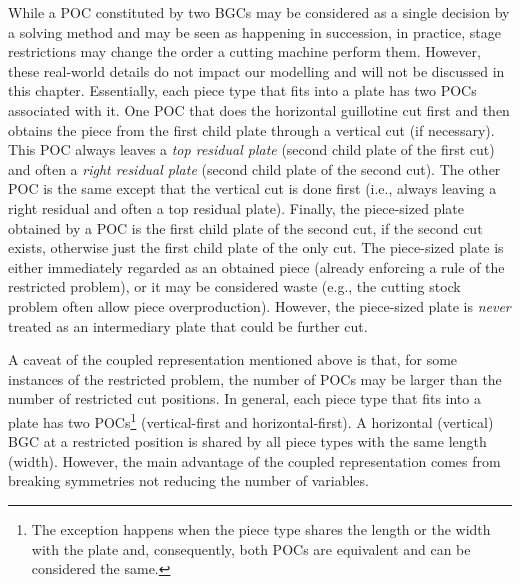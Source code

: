 \documentclass[ppgc,tese,english,formais,babel]{iiufrgs}
\begin{document}
While a POC constituted by two BGCs may be considered as a single decision by a solving method and may be seen as happening in succession, in practice, stage restrictions may change the order a cutting machine perform them.
However, these real-world details do not impact our modelling and will not be discussed in this chapter.
Essentially, each piece type that fits into a plate has two POCs associated with it.
One POC that does the horizontal guillotine cut first and then obtains the piece from the first child plate through a vertical cut (if necessary).
This POC always leaves a \emph{top residual plate} (second child plate of the first cut) and often a \emph{right residual plate} (second child plate of the second cut).
The other POC is the same except that the vertical cut is done first (i.e., always leaving a right residual and often a top residual plate).
Finally, the piece-sized plate obtained by a POC is the first child plate of the second cut, if the second cut exists, otherwise just the first child plate of the only cut.
The piece-sized plate is either immediately regarded as an obtained piece (already enforcing a rule of the restricted problem), or it may be considered waste (e.g., the cutting stock problem often allow piece overproduction).
However, the piece-sized plate is \emph{never} treated as an intermediary plate that could be further cut.

A caveat of the coupled representation mentioned above is that, for some instances of the restricted problem, the number of POCs may be larger than the number of restricted cut positions.
In general, each piece type that fits into a plate has two POCs\footnote{The exception happens when the piece type shares the length or the width with the plate and, consequently, both POCs are equivalent and can be considered the same.} (vertical-first and horizontal-first).
A horizontal (vertical) BGC at a restricted position is shared by all piece types with the same length (width).
However, the main advantage of the coupled representation comes from breaking symmetries not reducing the number of variables.
\end{document}
